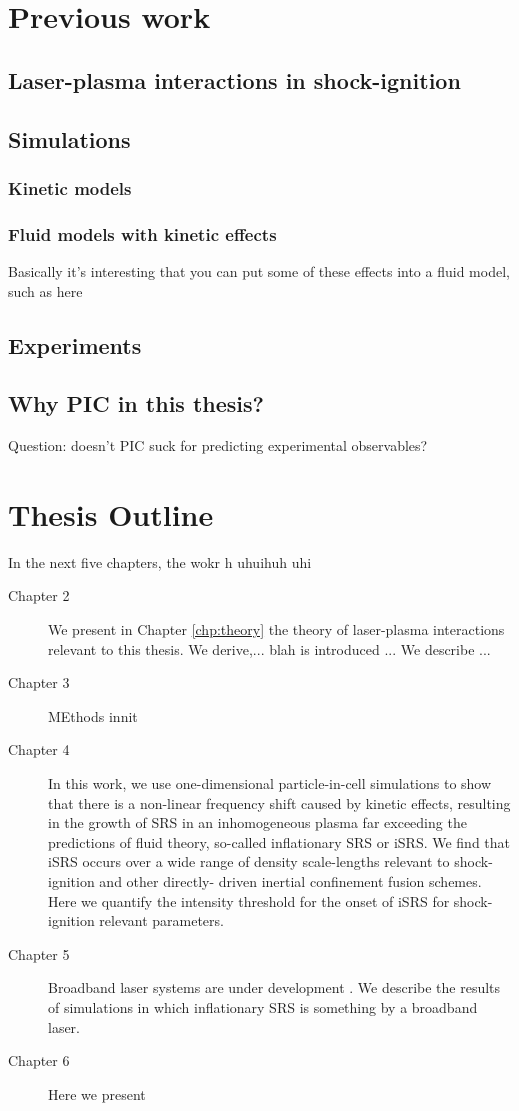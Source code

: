 \section{Previous work}
\subsection{Laser-plasma interactions in shock-ignition}
\subsection{Simulations}
\subsubsection{Kinetic models}
\subsubsection{Fluid models with kinetic effects}
Basically it's interesting that you can put some of these effects into a fluid model, such as here \citep{Tran2020}
\subsection{Experiments}

\subsection{Why PIC in this thesis?}
Question: doesn't PIC suck for predicting experimental observables? 

\section{Thesis Outline}
In the next five chapters, the wokr h uhuihuh uhi 

\begin{description}
	\item[Chapter 2] We present in Chapter \ref{chp:theory} the theory of laser-plasma interactions relevant to this thesis. We derive,... blah is introduced ... We describe ... 
	\item[Chapter 3] MEthods innit
	\item[Chapter 4] In this work, we use one-dimensional particle-in-cell 		
		simulations to show that there is a non-linear frequency shift caused  
		by kinetic effects, resulting in the growth of SRS in an inhomogeneous 
		plasma far exceeding the predictions of fluid theory, so-called 
		inflationary SRS or iSRS. We find that iSRS occurs over a wide range of 
		density scale-lengths relevant to shock-ignition and other directly-
		driven inertial confinement fusion schemes. Here we quantify the 
		intensity threshold for the onset of iSRS for shock-ignition relevant 
		parameters.
	\item[Chapter 5] Broadband laser systems are under development . We 	
		describe the results of simulations in which inflationary SRS is 	
		something by a broadband laser.
	\item[Chapter 6] Here we present 
\end{description}


%
%

